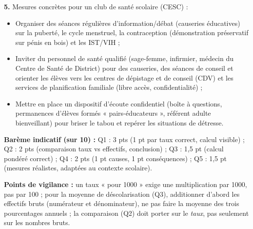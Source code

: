\documentclass[11pt]{article}
\begin{document}
\begin{corrige}
\textbf{5.} Mesures concrètes pour un club de santé scolaire (CESC) :
\begin{itemize}
\item Organiser des séances régulières d'information/débat (causeries éducatives) sur la puberté, le cycle menstruel, la contraception (démonstration préservatif sur pénis en bois) et les IST/VIH ;
\item Inviter du personnel de santé qualifié (sage-femme, infirmier, médecin du Centre de Santé de District) pour des causeries, des séances de conseil et orienter les élèves vers les centres de dépistage et de conseil (CDV) et les services de planification familiale (libre accès, confidentialité) ;
\item Mettre en place un dispositif d'écoute confidentiel (boîte à questions, permanences d'élèves formés « pairs-éducateurs », référent adulte bienveillant) pour briser le tabou et repérer les situations de détresse.
\end{itemize}

\textbf{Barème indicatif (sur 10) :} Q1 : 3 pts (1 pt par taux correct, calcul visible) ; Q2 : 2 pts (comparaison taux vs effectifs, conclusion) ; Q3 : 1,5 pt (calcul pondéré correct) ; Q4 : 2 pts (1 pt causes, 1 pt conséquences) ; Q5 : 1,5 pt (mesures réalistes, adaptées au contexte scolaire).

\textbf{Points de vigilance :} un taux « pour 1000 » exige une multiplication par 1000, pas par 100 ; pour la moyenne de déscolarisation (Q3), additionner d'abord les effectifs bruts (numérateur et dénominateur), ne pas faire la moyenne des trois pourcentages annuels ; la comparaison (Q2) doit porter sur le \emph{taux}, pas seulement sur les nombres bruts.
\end{corrige}
\end{document}
